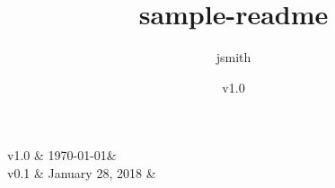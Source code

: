 \documentclass{readme}
\author{jsmith}
\title{sample-readme}
\date{v1.0}
\begin{document}
	\now

	\begin{what}
		\lipsum[2-2]
	\end{what}

	\begin{why}
		\lipsum[3-4]
	\end{why}

	\begin{cont}
		\lipsum[1-1]
	\end{cont}
	
	\begin{how}
		\lipsum[5-6]
	\end{how}

	\begin{who}
		\lipsum[7-9]
	\end{who}

	\begin{whence}
		v1.0 & \today				& \lipsum[10-10] \\
		v0.1 & January 28, 2018		& \lipsum[11-11] \\
	\end{whence}
\end{document}
